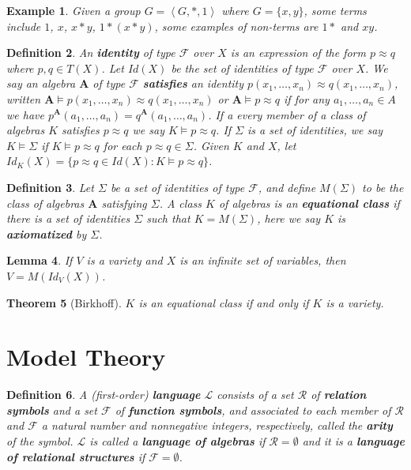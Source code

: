\documentclass[12pt,a4paper]{article}
\newtheorem{theorem}{Theorem}[section]
\newtheorem{lemma}[theorem]{Lemma}
\newtheorem{example}[theorem]{Example}
\newtheorem{definition}[theorem]{Definition}
\newcommand\CR{\mathcal{R}}
\newcommand\FF{\mathcal{F}}
\newcommand\LL{\mathcal{L}}
\begin{document}
\begin{example}
Given a group $G=\left<G,*,1\right>$ where $G=\{x,y\}$, some terms include $1$, $x$, $x*y$, $1*(x*y)$, some examples of non-terms are $1*$ and $xy$.
\end{example}

\begin{definition}
    An \textbf{identity} of type $\FF$ over $X$ is an expression of the form $p\approx q$ where $p,q\in T(X)$.
    Let $Id(X)$ be the set of identities of type $\FF$ over $X$.
    We say an algebra $\mathbf{A}$ of type $\FF$ \textbf{satisfies} an identity $p(x_1,\ldots,x_n)\approx q(x_1,\ldots,x_n)$, written $\mathbf{A}\models p(x_1,\ldots,x_n)\approx q(x_1,\ldots,x_n)$ or $\mathbf{A}\models p\approx q$ if for any $a_1,\ldots,a_n\in A$ we have $p^\mathbf{A}(a_1,\ldots,a_n)=q^\mathbf{A}(a_1,\ldots,a_n)$. 
    If a every member of a class of algebras $K$ satisfies $p\approx q$ we say $K\models p\approx q$.
    If $\Sigma$ is a set of identities, we say $K\models\Sigma$ if $K\models p\approx q$ for each $p\approx q\in\Sigma$.
    Given $K$ and $X$, let $Id_K(X)=\{p\approx q\in Id(X): K\models p\approx q\}$.
\end{definition}

\begin{definition}
    Let $\Sigma$ be a set of identities of type $\FF$, and define $M(\Sigma)$ to be the class of algebras $\mathbf{A}$ satisfying $\Sigma$.
    A class $K$ of algebras is an \textbf{equational class} if there is a set of identities $\Sigma$ such that $K=M(\Sigma)$, here we say $K$ is \textbf{axiomatized} by $\Sigma$.
\end{definition}

\begin{lemma}
    If $V$ is a variety and $X$ is an infinite set of variables, then $V=M(Id_V(X))$.
\end{lemma}

\begin{theorem}[Birkhoff]
    $K$ is an equational class if and only if $K$ is a variety.
\end{theorem}

\section{Model Theory}

\begin{definition}
    A (first-order) \textbf{language} $\mathcal{L}$ consists of a set $\mathcal{R}$ of \textbf{relation symbols} and a set $\FF$ of \textbf{function symbols}, and associated to each member of $\CR$ and $\FF$ a natural number and nonnegative integers, respectively, called the \textbf{arity} of the symbol.
    $\LL$ is called a \textbf{language of algebras} if $\CR=\emptyset$ and it is a \textbf{language of relational structures} if $\FF=\emptyset$.
\end{definition}
\end{document}
